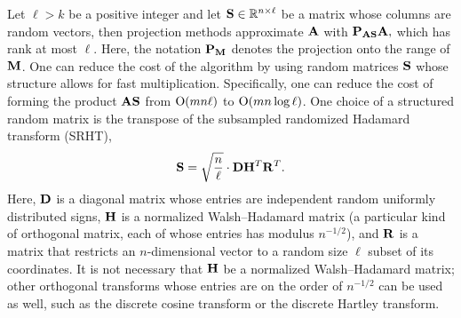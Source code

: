 
Let $\ell > k$ be a positive integer and let $\mathbf{S} \in \mathbb{R}^{n \times \ell}$ 
be a matrix whose columns are random vectors, then projection methods 
approximate $\mathbf{A}$ with $\mathbf{P}_{\mathbf{A} \mathbf{S}} \mathbf{A},$ which has 
rank at most $\ell.$ Here, the notation $\mathbf{P}_{\mathbf{M}}$ denotes the projection 
onto the range of $\mathbf{M}$. One can 
reduce the cost of the algorithm by using random matrices $\mathbf{S}$ whose structure 
allows for fast multiplication. Specifically, one can reduce the cost of 
forming the product $\mathbf{A} \mathbf{S}$ from $\mathrm{O}(mn\ell)$ to 
$\mathrm{O}(m n \log \ell )$. One choice of a structured random matrix is the
transpose of the subsampled randomized Hadamard transform (SRHT),
\[
 \mathbf{S} = \sqrt{\frac{n}{\ell}} \cdot \mathbf{D} \mathbf{H}^T \mathbf{R}^T.
\]
Here, $\mathbf{D}$ is a diagonal matrix whose entries are independent random 
uniformly distributed signs, $\mathbf{H}$ is a normalized Walsh--Hadamard matrix
(a particular kind of orthogonal matrix, each of whose entries has modulus 
$n^{-1/2}$), and $\mathbf{R}$ is a matrix that restricts an $n$-dimensional 
vector to a random size $\ell$ subset of its coordinates. It is not necessary 
that $\mathbf{H}$ be a normalized Walsh--Hadamard matrix; other orthogonal 
transforms whose entries are on the order of $n^{-1/2}$ can be used as 
well, such as the discrete cosine transform or the discrete Hartley transform.

